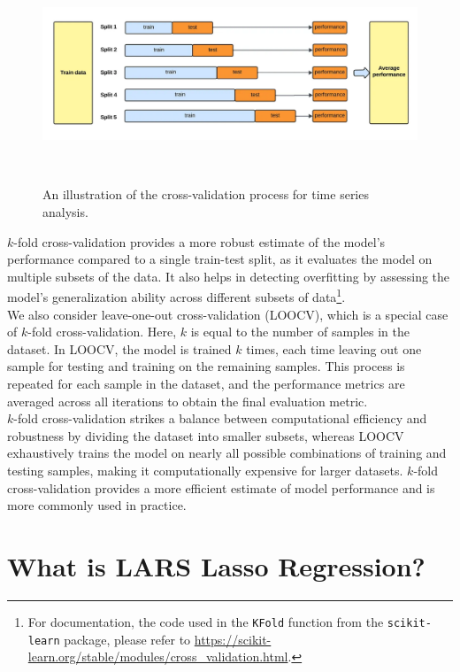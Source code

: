 \documentclass{ledger}
\begin{document}
\begin{figure}[!ht]
\centering
	\includegraphics[width=400pt]{cross_validation_timeseries.pdf}
	\caption{An illustration of the cross-validation process for time series analysis.\label{figure:cross_validation}} ~\\
\end{figure}


$k$-fold cross-validation provides a more robust estimate of the model's performance compared to a single train-test split, as it evaluates the model on multiple subsets of the data. It also helps in detecting overfitting by assessing the model's generalization ability across different subsets of data\footnote{For documentation, the code used in the \texttt{KFold} function from the \texttt{scikit-learn} package, please refer to \href{https://scikit-learn.org/stable/modules/cross\_validation.html}{https://scikit-learn.org/stable/modules/cross\_validation.html}.}. \\

We also consider leave-one-out cross-validation (LOOCV), which is a special case of $k$-fold cross-validation. Here, $k$ is equal to the number of samples in the dataset. In LOOCV, the model is trained $k$ times, each time leaving out one sample for testing and training on the remaining samples. This process is repeated for each sample in the dataset, and the performance metrics are averaged across all iterations to obtain the final evaluation metric. \\

$k$-fold cross-validation strikes a balance between computational efficiency and robustness by dividing the dataset into smaller subsets, whereas LOOCV exhaustively trains the model on nearly all possible combinations of training and testing samples, making it computationally expensive for larger datasets. $k$-fold cross-validation provides a more efficient estimate of model performance and is more commonly used in practice. \\

\section{What is LARS Lasso Regression?}
\end{document}
